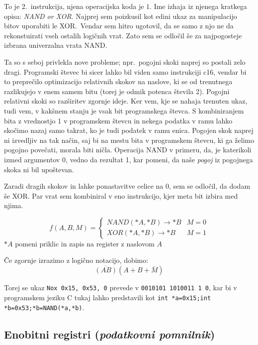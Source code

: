 \documentclass[12pt]{article}
\begin{document}
To je 2.\ instrukcija, njena operacijska koda je $1$.
Ime izhaja iz njenega kratkega opisa: \textit{NAND or XOR}.
Najprej sem poizkusil kot edini ukaz za manipulacijo bitov uporabiti le XOR.\
Vendar sem hitro ugotovil, da se samo z njo ne da rekonstuirati vseh ostalih logičnih vrat.
Zato sem se odločil še za najpogosteje izbrana univerzalna vrata NAND.\@

Ta so s seboj privlekla nove probleme; npr.\ pogojni skoki naprej so postali zelo dragi.
Programski števec bi sicer lahko bil viden samo instrukciji c16, vendar bi to preprečilo optimizacijo relativnih skokov na naslove, ki se od trenutnega razlikujejo v enem samem bitu (torej je odmik potenca števila 2).
Pogojni relativni skoki so razširitev zgornje ideje.
Ker vem, kje se nahaja trenuten ukaz, tudi vem, v kakšnem stanju je vsak bit programskega števca.
S kombiniranjem bita z vrednostjo 1 v programskem števcu in nekega podatka v ramu lahko skočimo nazaj samo takrat, ko je tudi podatek v ramu enica.
Pogojen skok naprej ni izvedljiv na tak način, saj bi na mestu bita v programskem števcu, ki ga želimo pogojno povečati, morala biti ničla.
Operacija NAND v primeru, da, je katerikoli izmed argumentov 0, vedno da rezultat 1, kar pomeni, da naše \textit{pogoj} iz pogojnega skoka ni bil upoštevan.

Zaradi dragih skokov in lahke ponastavitve celice na 0, sem se odločil, da dodam še XOR.\@
Par vrat sem kombiniral v eno instrukcijo, kjer meta bit izbira med njima.

\begin{displaymath}
  f(A,B,M) =
  \begin{cases}
    NAND(*A, *B) \rightarrow *B & M=0\\
    XOR(*A, *B) \rightarrow *B & M=1
  \end{cases}
\end{displaymath}
$*A$ pomeni priklic in zapis na register z naslovom $A$

Če zgornje izrazimo z logično notacijo, dobimo:
\begin{displaymath}
  \overline{(AB)}(A+B+\overline{M})
\end{displaymath}

Torej se ukaz \verb|Nox 0x15, 0x53, 0| prevede v \verb|0010101 1010011 1 0|, kar bi v programskem jeziku C tukaj lahko predstavili kot \verb|int *a=0x15;int *b=0x53;*b=NAND(*a,*b)|.

\pagebreak
\subsection{Enobitni registri (\textit{podatkovni pomnilnik})}
\end{document}
